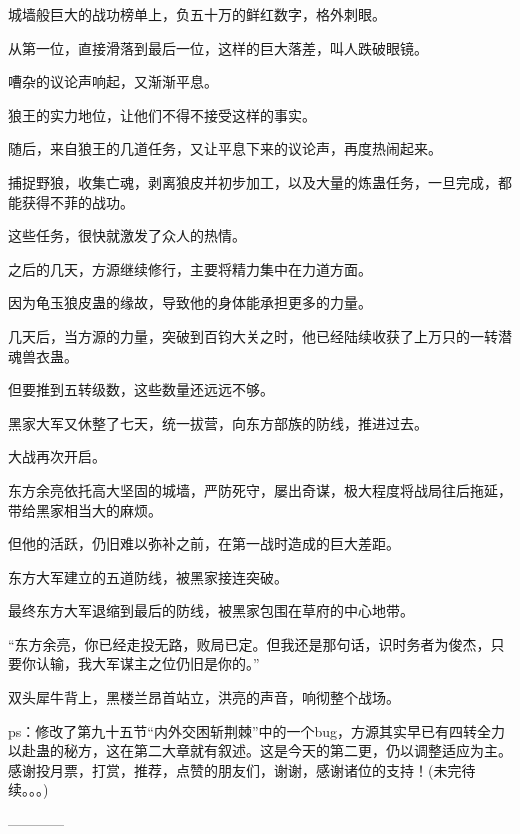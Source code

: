 \begin{this_body}
城墙般巨大的战功榜单上，负五十万的鲜红数字，格外刺眼。

从第一位，直接滑落到最后一位，这样的巨大落差，叫人跌破眼镜。

嘈杂的议论声响起，又渐渐平息。

狼王的实力地位，让他们不得不接受这样的事实。

随后，来自狼王的几道任务，又让平息下来的议论声，再度热闹起来。

捕捉野狼，收集亡魂，剥离狼皮并初步加工，以及大量的炼蛊任务，一旦完成，都能获得不菲的战功。

这些任务，很快就激发了众人的热情。

之后的几天，方源继续修行，主要将精力集中在力道方面。

因为龟玉狼皮蛊的缘故，导致他的身体能承担更多的力量。

几天后，当方源的力量，突破到百钧大关之时，他已经陆续收获了上万只的一转潜魂兽衣蛊。

但要推到五转级数，这些数量还远远不够。

黑家大军又休整了七天，统一拔营，向东方部族的防线，推进过去。

大战再次开启。

东方余亮依托高大坚固的城墙，严防死守，屡出奇谋，极大程度将战局往后拖延，带给黑家相当大的麻烦。

但他的活跃，仍旧难以弥补之前，在第一战时造成的巨大差距。

东方大军建立的五道防线，被黑家接连突破。

最终东方大军退缩到最后的防线，被黑家包围在草府的中心地带。

“东方余亮，你已经走投无路，败局已定。但我还是那句话，识时务者为俊杰，只要你认输，我大军谋主之位仍旧是你的。”

双头犀牛背上，黑楼兰昂首站立，洪亮的声音，响彻整个战场。

ps：修改了第九十五节“内外交困斩荆棘”中的一个bug，方源其实早已有四转全力以赴蛊的秘方，这在第二大章就有叙述。这是今天的第二更，仍以调整适应为主。感谢投月票，打赏，推荐，点赞的朋友们，谢谢，感谢诸位的支持！(未完待续。。。)

------------

\end{this_body}

